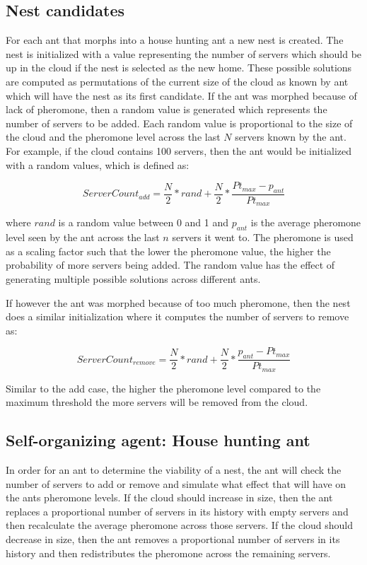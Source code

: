 \subsection{Nest candidates}

For each ant that morphs into a house hunting ant a new nest is created. The nest is initialized with a value representing the number of servers which should be up in the cloud if the nest is selected as the new home. These possible solutions are computed as permutations of the current size of the cloud as known by ant which will have the nest as its first candidate. If the ant was morphed because of lack of pheromone, then a random value is generated which represents the number of servers to be added. Each random value is proportional to the size of the cloud and the pheromone level across the last $N$ servers known by the ant. For example, if the cloud contains 100 servers, then the ant would be initialized with a random values, which is defined as:

\begin{equation}
ServerCount_{add} = \frac{N}{2} * rand + \frac{N}{2} * \frac{Pt_{max} - p_{ant}}{Pt_{max}}
\end{equation}

where $rand$ is a random value between 0 and 1 and $p_{ant}$ is the average pheromone level seen by the ant across the last $n$ servers it went to. The pheromone is used as a scaling factor such that the lower the pheromone value, the higher the probability of more servers being added. The random value has the effect of generating multiple possible solutions across different ants.

If however the ant was morphed because of too much pheromone, then the nest does a similar initialization where it computes the number of servers to remove as:

\begin{equation}
ServerCount_{remove} = \frac{N}{2} * rand + \frac{N}{2} * \frac{p_{ant} - Pt_{max}}{Pt_{max}}
\end{equation}

Similar to the add case, the higher the pheromone level compared to the maximum threshold the more servers will be removed from the cloud.

\subsection{Self-organizing agent: House hunting ant}

In order for an ant to determine the viability of a nest, the ant will check the number of servers to add or remove and simulate what effect that will have on the ants pheromone levels. If the cloud should increase in size, then the ant replaces a proportional number of servers in its history with empty servers and then recalculate the average pheromone across those servers. If the cloud should decrease in size, then the ant removes a proportional number of servers in its history and then redistributes the pheromone across the remaining servers.

